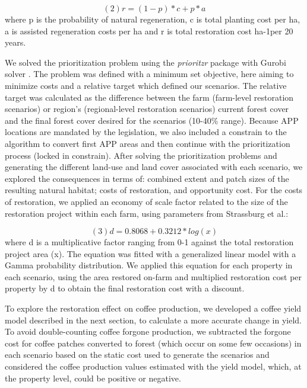 \documentclass[
	12pt,				%
	oneside,			%
	a4paper,			%
	chapter=TITLE,		%
	section=TITLE,		%
	brazil,			%
	english				%
	]{abntex2}
\begin{document}
\[ (2)  r=(1-p)*c+p*a \]
where p is the probability of natural regeneration, c is total planting cost per ha, a is assisted regeneration costs per ha and r is total restoration cost ha-1per 20 years.

We solved the prioritization problem using the \emph{prioritzr} package \autocite{hanson_prioritizr_2020} with Gurobi solver \autocite{gurobi_optimization_gurobi_2020}. The problem was defined with a minimum set objective, here aiming to minimize costs and a relative target which defined our scenarios. The relative target was calculated as the difference between the farm (farm-level restoration scenarios) or region's (regional-level restoration scenarios) current forest cover and the final forest cover desired for the scenarios (10-40\% range). Because APP locations are mandated by the legislation, we also included a constrain to the algorithm to convert first APP areas and then continue with the prioritization process (locked in constrain). After solving the prioritization problems and generating the different land-use and land cover associated with each scenario, we explored the consequences in terms of: combined extent and patch sizes of the resulting natural habitat; costs of restoration, and opportunity cost. For the costs of restoration, we applied an economy of scale factor related to the size of the restoration project within each farm, using parameters from Strassburg et al.\autocite*{strassburg_strategic_2019}:

\[ (3)  d = 0.8068 + 0.3212 * log(x) \]
where d is a multiplicative factor ranging from 0-1 against the total restoration project area (x). The equation was fitted with a generalized linear model with a Gamma probability distribution. We applied this equation for each property in each scenario, using the area restored on-farm and multiplied restoration cost per property by d to obtain the final restoration cost with a discount.

To explore the restoration effect on coffee production, we developed a coffee yield model described in the next section, to calculate a more accurate change in yield. To avoid double-counting coffee forgone production, we subtracted the forgone cost for coffee patches converted to forest (which occur on some few occasions) in each scenario based on the static cost used to generate the scenarios and considered the coffee production values estimated with the yield model, which, at the property level, could be positive or negative.
\end{document}
